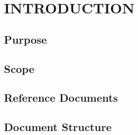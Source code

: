 \section{INTRODUCTION}

	\subsection{Purpose}

	\subsection{Scope}

	

	\subsection{Reference Documents}

	\subsection{Document Structure}
